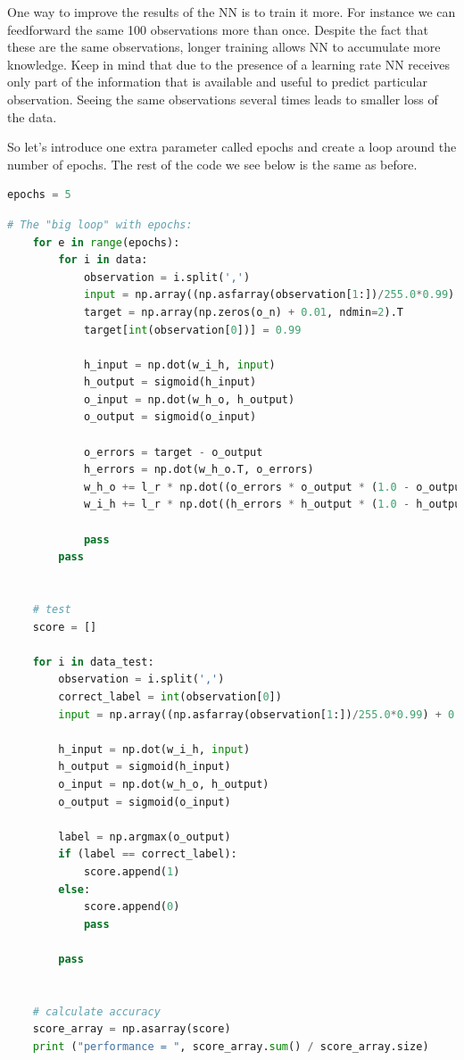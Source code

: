 One way to improve the results of the NN is to train it more. For instance we can feedforward the same 100 observations more than once. Despite the fact that these are the same observations, longer training allows NN to accumulate more knowledge. Keep in mind that due to the presence of a learning rate NN receives only part of the information that is available and useful to predict particular observation. Seeing the same observations several times leads to smaller loss of the data.
   
So let's introduce one extra parameter called epochs and create a loop around the number of epochs. The rest of the code we see below is the same as before.
   
\begin{lstlisting}[language=Python]   
    epochs = 5
\end{lstlisting}

\begin{lstlisting}[language=Python]   
    # The "big loop" with epochs:
    for e in range(epochs):
        for i in data:
            observation = i.split(',')
            input = np.array((np.asfarray(observation[1:])/255.0*0.99) + 0.01, ndmin=2).T
            target = np.array(np.zeros(o_n) + 0.01, ndmin=2).T
            target[int(observation[0])] = 0.99
    
            h_input = np.dot(w_i_h, input)
            h_output = sigmoid(h_input)
            o_input = np.dot(w_h_o, h_output)
            o_output = sigmoid(o_input)
    
            o_errors = target - o_output
            h_errors = np.dot(w_h_o.T, o_errors)
            w_h_o += l_r * np.dot((o_errors * o_output * (1.0 - o_output)), np.transpose(h_output))
            w_i_h += l_r * np.dot((h_errors * h_output * (1.0 - h_output)), np.transpose(input))
    
            pass
        pass
    
    
    # test
    score = []
    
    for i in data_test:
        observation = i.split(',')
        correct_label = int(observation[0])
        input = np.array((np.asfarray(observation[1:])/255.0*0.99) + 0.01, ndmin=2).T
    
        h_input = np.dot(w_i_h, input)
        h_output = sigmoid(h_input)
        o_input = np.dot(w_h_o, h_output)
        o_output = sigmoid(o_input)
    
        label = np.argmax(o_output)
        if (label == correct_label):
            score.append(1)
        else:
            score.append(0)
            pass
        
        pass
    
    
    # calculate accuracy
    score_array = np.asarray(score)
    print ("performance = ", score_array.sum() / score_array.size)
\end{lstlisting}

